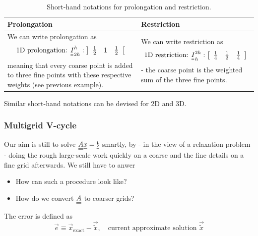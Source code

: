 \begin{table}[H]
    \centering
    \begin{tabular}{|p{}|p{}|}
        \hline
        \textbf{Prolongation} & \textbf{Restriction} \\
        \hline
        We can write prolongation as
        \begin{equation}
            \text{1D prolongation: } \mat{I}_{2h}^{h}: \left] \begin{array}{lll} \frac{1}{2} & 1 & \frac{1}{2} \end{array} \right[
        \end{equation}
        meaning that every coarse point is added to three fine points with these respective weights (see previous example). &
        We can write restriction as
        \begin{equation}
            \text{1D restriction: } \mat{I}_{h}^{2h}: \left[ \begin{array}{lll} \frac{1}{4} & \frac{1}{2} & \frac{1}{4} \end{array} \right]
        \end{equation}
        - the coarse point is the weighted sum of the three fine points. \\
        \hline
    \end{tabular}
    \caption{Short-hand notations for prolongation and restriction.}
    \label{tab:pro_res_short}
\end{table}

Similar short-hand notations can be devised for 2D and 3D.

\subsubsection{Multigrid V-cycle}
Our aim is still to solve $\mat{A}\vec{x} = \vec{b}$ smartly, by - in the view
of a relaxation problem - doing the rough large-scale work quickly on a coarse
and the fine details on a fine grid afterwards. We still have to anwer
\begin{itemize}
    \item How can such a procedure look like?
    \item How do we convert $\mat{A}$ to coarser grids?
\end{itemize}

The error is defined as
\begin{equation}
    \vec{e} \equiv \vec{x}_{\text{exact}} - \vec{\tilde{x}}, \quad \text{current approximate solution } \vec{\tilde{x}}
\end{equation}

